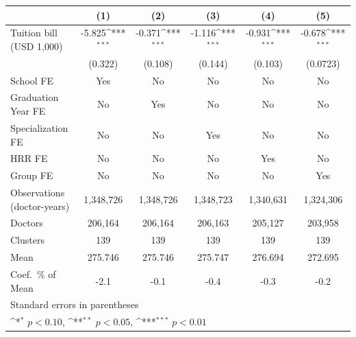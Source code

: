 {
\def\sym#1{\ifmmode^{#1}\else\(^{#1}\)\fi}
\begin{tabular}{l*{5}{c}}
\hline\hline
                    &\multicolumn{1}{c}{(1)}         &\multicolumn{1}{c}{(2)}         &\multicolumn{1}{c}{(3)}         &\multicolumn{1}{c}{(4)}         &\multicolumn{1}{c}{(5)}         \\
\hline
Tuition bill (USD 1,000)&      -5.825\sym{***}&      -0.371\sym{***}&      -1.116\sym{***}&      -0.931\sym{***}&      -0.678\sym{***}\\
                    &     (0.322)         &     (0.108)         &     (0.144)         &     (0.103)         &    (0.0723)         \\
[1em]
School FE           &         Yes         &          No         &          No         &          No         &          No         \\
[1em]
Graduation Year FE  &          No         &         Yes         &          No         &          No         &          No         \\
[1em]
Specialization FE   &          No         &          No         &         Yes         &          No         &          No         \\
[1em]
HRR FE              &          No         &          No         &          No         &         Yes         &          No         \\
[1em]
Group FE            &          No         &          No         &          No         &          No         &         Yes         \\
\hline
Observations (doctor-years)&   1,348,726         &   1,348,726         &   1,348,723         &   1,340,631         &   1,324,306         \\
Doctors             &     206,164         &     206,164         &     206,163         &     205,127         &     203,958         \\
Clusters            &         139         &         139         &         139         &         139         &         139         \\
Mean                &     275.746         &     275.746         &     275.747         &     276.694         &     272.695         \\
Coef.\ \% of Mean   &        -2.1         &        -0.1         &        -0.4         &        -0.3         &        -0.2         \\
\hline\hline
\multicolumn{6}{l}{\footnotesize Standard errors in parentheses}\\
\multicolumn{6}{l}{\footnotesize \sym{*} \(p<0.10\), \sym{**} \(p<0.05\), \sym{***} \(p<0.01\)}\\
\end{tabular}
}
